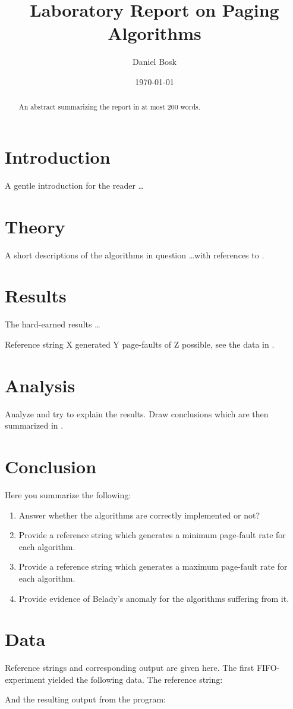 \documentclass[a4paper]{article}
\title{Laboratory Report on Paging Algorithms}
\author{Daniel Bosk}
\date{\today}
\begin{document}
\maketitle
\begin{abstract}
	An abstract summarizing the report in at most 200 words.
\end{abstract}


\section{Introduction}
\label{sec:Intro}
A gentle introduction for the reader \dots


\section{Theory}
\label{sec:Theory}
A short descriptions of the algorithms in question \dots with references to
\citet{Silberschatz2009osc,Silberschatz2013intl,Silberschatz2013osc}.


\section{Results}
\label{sec:Results}
The hard-earned results \dots

Reference string X generated Y page-faults of Z possible, see the data in 
.


\section{Analysis}
\label{sec:Analysis}
Analyze and try to explain the results.
Draw conclusions which are then summarized in .


\section{Conclusion}
\label{sec:Conclusion}
Here you summarize the following:
\begin{enumerate}
	\item Answer whether the algorithms are correctly implemented or not?
	\item Provide a reference string which generates a minimum page-fault rate 
		for each algorithm.
	\item Provide a reference string which generates a maximum page-fault rate 
		for each algorithm.
	\item Provide evidence of Belady's anomaly for the algorithms suffering from 
		it.
\end{enumerate}




\appendix

\section{Data}
\label{app:Data}
Reference strings and corresponding output are given here.
The first FIFO-experiment yielded the following data.
The reference string:

And the resulting output from the program:

\end{document}
